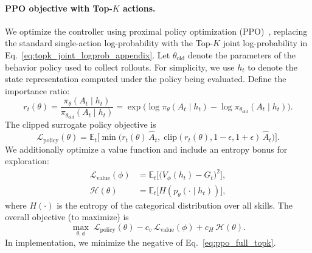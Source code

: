 \paragraph{PPO objective with Top-$K$ actions.}
We optimize the controller using proximal policy optimization (PPO)~\citep{schulman2017proximal}, replacing the standard single-action log-probability with the Top-$K$ joint log-probability in Eq.~\ref{eq:topk_joint_logprob_appendix}.
Let $\theta_{\text{old}}$ denote the parameters of the behavior policy used to collect rollouts.
For simplicity, we use $h_t$ to denote the state representation computed under the policy being evaluated.
Define the importance ratio:
\begin{equation}
r_t(\theta)=
\frac{\pi_\theta(A_t\mid h_t)}{\pi_{\theta_{\text{old}}}(A_t\mid h_t)}
=
\exp\Big(\log\pi_\theta(A_t\mid h_t)-\log\pi_{\theta_{\text{old}}}(A_t\mid h_t)\Big).
\label{eq:topk_ratio}
\end{equation}
The clipped surrogate policy objective is
\begin{equation}
\mathcal{L}_{\text{policy}}(\theta)
=
\mathbb{E}_t\Big[
\min\big(r_t(\theta)\,\hat{A}_t,\;
\mathrm{clip}(r_t(\theta),1-\epsilon,1+\epsilon)\,\hat{A}_t\big)
\Big].
\label{eq:ppo_policy_topk}
\end{equation}
We additionally optimize a value function and include an entropy bonus for exploration:
\begin{align}
\mathcal{L}_{\text{value}}(\phi)
&=
\mathbb{E}_t\Big[
\big(V_\phi(h_t)-G_t\big)^2
\Big], \label{eq:ppo_value}\\
\mathcal{H}(\theta)
&=
\mathbb{E}_t\big[H(p_\theta(\cdot\mid h_t))\big], \label{eq:ppo_entropy}
\end{align}
where $H(\cdot)$ is the entropy of the categorical distribution over all skills.
The overall objective (to maximize) is
\begin{equation}
\max_{\theta,\phi}\;
\mathcal{L}_{\text{policy}}(\theta)
- c_v\,\mathcal{L}_{\text{value}}(\phi)
+ c_H\,\mathcal{H}(\theta).
\label{eq:ppo_full_topk}
\end{equation}
In implementation, we minimize the negative of Eq.~\ref{eq:ppo_full_topk}.

